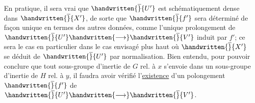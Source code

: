 
En pratique, il sera vrai que $\handwritten{\overline}{U'}$ est schématiquement dense dans $\handwritten{\overline}{X'}$, de sorte que $\handwritten{\overline}{f'}$ sera déterminé de façon unique en termes des autres données, comme l'unique prolongement de $\handwritten{\overline}{U'}\handwritten{\longrightarrow}\handwritten{\overline}{V'}$ induit par $f'$; ce sera le cas en particulier dans le cas envisagé plus haut où $\handwritten{\overline}{X'}$ se déduit de  $\handwritten{\overline}{U'}$ par normalisation. Bien entendu, pour pouvoir conclure que tout sous-groupe d'inertie de $G$ rel. à $x$ s'envoie dans un sous-groupe d'inertie de $H$ rel. à $y$, il faudra avoir vérifié l'\uline{existence} d'un polongement $\handwritten{\overline}{f'}$ de $\handwritten{\overline}{U'}\handwritten{\longrightarrow}\handwritten{\overline}{V'}$. 

